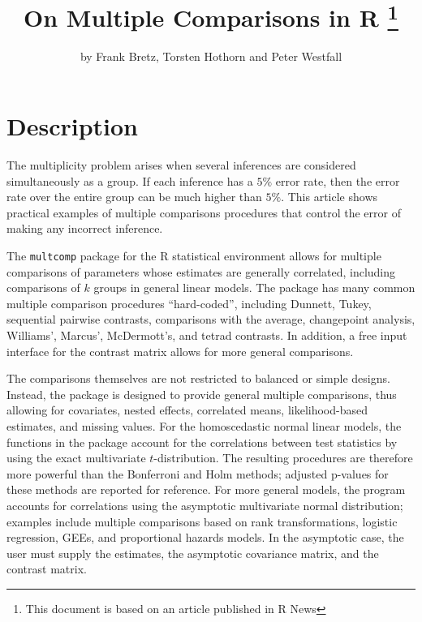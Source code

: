 \documentclass{article}
\begin{document}
\title{On Multiple Comparisons in \textsf{R} \thanks{This document is based
on an article published in \textsf{R} News} }
\author{by Frank Bretz, Torsten Hothorn and Peter Westfall}
\date{}
\maketitle


\section{Description}

The multiplicity problem arises when several inferences are considered
simultaneously as a group.  If each inference has a $5\%$ error rate, 
then the error rate over the entire group can be much higher than $5\%$.  
This article shows practical examples of multiple comparisons 
procedures that control the error of making any incorrect inference.

The \texttt{multcomp} package for the \textsf{R} statistical
environment allows for multiple comparisons of parameters whose
estimates are generally correlated, including comparisons of $k$
groups in general linear models. The package has many common
multiple comparison procedures ``hard-coded'', including Dunnett,
Tukey, sequential pairwise contrasts, comparisons with the
average, changepoint analysis, Williams', Marcus', McDermott's,
and tetrad contrasts. In addition, a free input interface for the
contrast matrix allows for more general comparisons.

The comparisons themselves are not restricted to balanced or simple
designs. Instead, the package is designed to provide general
multiple comparisons, thus allowing for covariates, nested
effects, correlated means, likelihood-based estimates, and missing
values. For the homoscedastic normal linear models, the functions in the package
account for the correlations between test statistics by using the
exact multivariate $t$-distribution. The resulting procedures are
therefore more powerful than the Bonferroni and Holm methods;
adjusted p-values for these methods are reported for reference.
For more general models,  the program accounts for correlations
using the asymptotic multivariate normal distribution; examples
include multiple comparisons based on rank transformations,
logistic regression, GEEs, and proportional hazards models.  In
the asymptotic case, the user must supply the estimates, the
asymptotic covariance matrix, and the contrast matrix.
\end{document}
